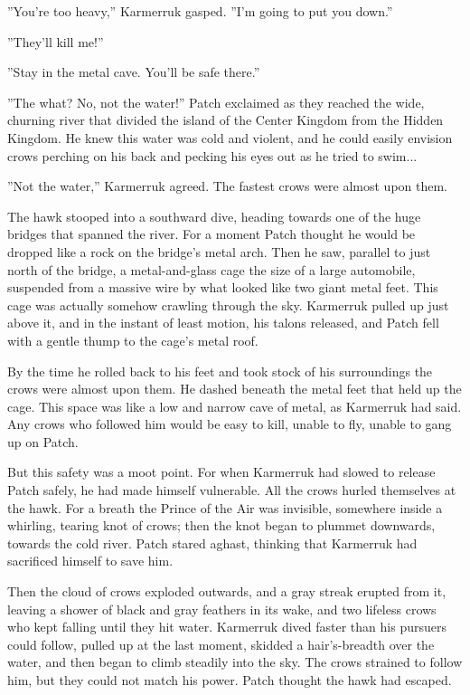 \documentclass[12pt]{book}
\begin{document}
 ''You're too heavy,'' Karmerruk gasped. ''I'm going to put you down.''\par
 ''They'll kill me!''\par
 ''Stay in the metal cave. You'll be safe there.''\par
 ''The what? No, not the water!'' Patch exclaimed as they reached the wide, churning river that divided the island of the Center Kingdom from the Hidden Kingdom. He knew this water was cold and violent, and he could easily envision crows perching on his back and pecking his eyes out as he tried to swim...\par
 ''Not the water,'' Karmerruk agreed. The fastest crows were almost upon them.\par
The hawk stooped into a southward dive, heading towards one of the huge bridges that spanned the river. For a moment Patch thought he would be dropped like a rock on the bridge's metal arch. Then he saw, parallel to just north of the bridge, a metal-and-glass cage the size of a large automobile, suspended from a massive wire by what looked like two giant metal feet. This cage was actually somehow crawling through the sky. Karmerruk pulled up just above it, and in the instant of least motion, his talons released, and Patch fell with a gentle thump to the cage's metal roof.\par
 By the time he rolled back to his feet and took stock of his surroundings the crows were almost upon them. He dashed beneath the metal feet that held up the cage. This space was like a low and narrow cave of metal, as Karmerruk had said. Any crows who followed him would be easy to kill, unable to fly, unable to gang up on Patch.\par
But this safety was a moot point. For when Karmerruk had slowed to release Patch safely, he had made himself vulnerable. All the crows hurled themselves at the hawk. For a breath the Prince of the Air was invisible, somewhere inside a whirling, tearing knot of crows; then the knot began to plummet downwards, towards the cold river. Patch stared aghast, thinking that Karmerruk had sacrificed himself to save him.\par
 Then the cloud of crows exploded outwards, and a gray streak erupted from it, leaving a shower of black and gray feathers in its wake, and two lifeless crows who kept falling until they hit water. Karmerruk dived faster than his pursuers could follow, pulled up at the last moment, skidded a hair's-breadth over the water, and then began to climb steadily into the sky. The crows strained to follow him, but they could not match his power. Patch thought the hawk had escaped.\par
\end{document}
